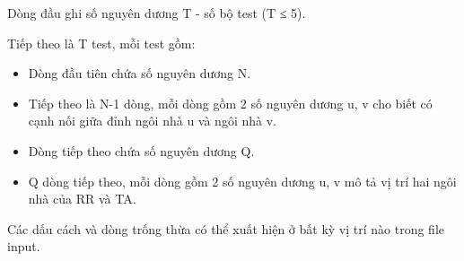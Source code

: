 Dòng đầu ghi số nguyên dương T - số bộ test (T ≤ 5).  

   Tiếp theo là T test, mỗi test gồm:  
\begin{itemize}
	\item     Dòng đầu tiên chứa số nguyên dương N.   
	\item     Tiếp theo là N-1 dòng, mỗi dòng gồm 2 số nguyên dương u, v cho biết có cạnh nối giữa đỉnh ngôi nhà u và ngôi nhà v.   
	\item     Dòng tiếp theo chứa số nguyên dương Q.   
	\item     Q dòng tiếp theo, mỗi dòng gồm 2 số nguyên dương u, v mô tả vị trí hai ngôi nhà của RR và TA.   
\end{itemize}

   Các dấu cách và dòng trống thừa có thể xuất hiện ở bất kỳ vị trí nào trong file input.